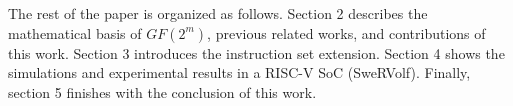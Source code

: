 The rest of the paper is organized as follows. Section 2 describes the mathematical basis of $GF(2^m)$, previous related works, 
and contributions of this work. Section 3 introduces the instruction set extension. Section 4 shows the simulations and 
experimental results in a RISC-V SoC (SweRVolf). Finally, section 5 finishes with the conclusion of this work.


